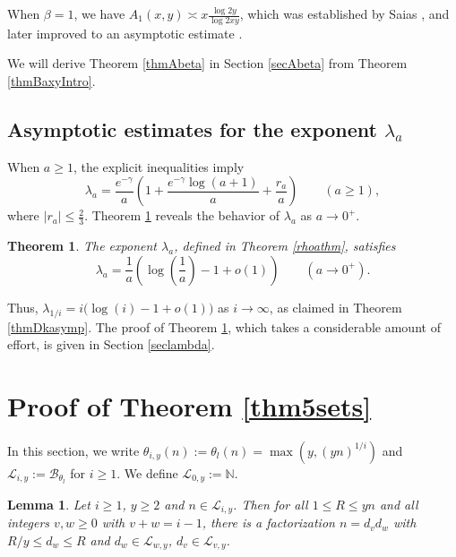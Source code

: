 \documentclass[11pt]{amsart}
\newtheorem{theorem}{Theorem}
\newtheorem{lemma}{Lemma}
\begin{document}
When $\beta=1$, we have $A_1(x,y) \asymp x \frac{\log 2y}{\log 2xy}$, which was established by Saias \cite{Saias1}, 
and later improved to an asymptotic estimate \cite{SSF}.

We will derive Theorem \ref{thmAbeta} in Section \ref{secAbeta} from Theorem \ref{thmBaxyIntro}.



\subsection{Asymptotic estimates for the exponent $\lambda_a$}

When $a\ge 1$, the explicit inequalities \cite[Eq. (8), (9)]{SPA} imply
$$
\lambda_a = \frac{e^{-\gamma}}{a}\left(1+\frac{e^{-\gamma} \log (a+1)}{a} +\frac{r_a}{a} \right) \qquad (a\ge 1),
$$
where $|r_a|\le\frac{2}{3}$.
Theorem \ref{thmlambda} reveals the behavior of $\lambda_a$ as $a\to 0^+$.

\begin{theorem}\label{thmlambda}
The exponent $\lambda_a$, defined in Theorem \ref{rhoathm}, satisfies
$$
\lambda_a = \frac{1}{a}\left(\log \left(\frac{1}{a}\right) -1 +o(1)\right)\qquad (a \to 0^+).
$$
\end{theorem}

Thus, $\lambda_{1/i}=i \bigl(\log(i)-1+o(1)\bigr)$ as $i\to \infty$, 
as claimed in Theorem \ref{thmDkasymp}.
The proof of Theorem \ref{thmlambda}, which takes a considerable amount of effort, is given in Section \ref{seclambda}.


\section{Proof of Theorem \ref{thm5sets}}\label{sec5sets}




In this section, we write $\theta_{i,y}(n) := \theta_l(n) = \max(y, (yn)^{1/i})$ and $\mathcal{L}_{i,y}:=\mathcal{B}_{\theta_l}$ for $i\ge 1$. We define $\mathcal{L}_{0,y}:= \mathbb{N}$. 

\begin{lemma}\label{lemprop}
Let $i\ge 1$, $y\ge 2$ and $n \in \mathcal{L}_{i,y}$. Then for all $1\le R\le yn$ and all integers $v, w \ge 0$ with $v+w=i-1$, there is a factorization
$n=d_v d_w$ with $R/y \le d_w \le R$ and $d_w \in \mathcal{L}_{w,y}$, $d_v \in \mathcal{L}_{v,y}$. 
\end{lemma}
\end{document}
